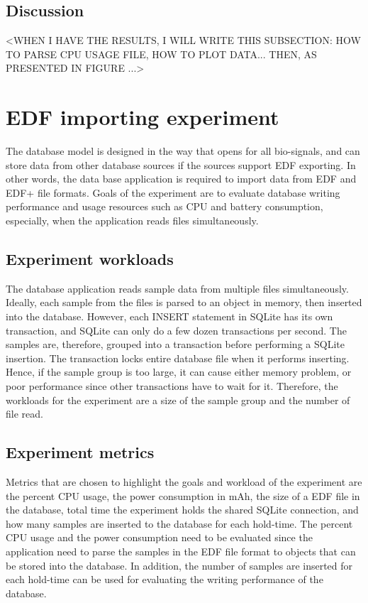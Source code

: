 \subsection{Discussion}
<WHEN I HAVE THE RESULTS, I WILL WRITE THIS SUBSECTION: HOW TO PARSE CPU USAGE FILE, HOW TO PLOT DATA... THEN, AS PRESENTED IN FIGURE ...>
\section{EDF importing experiment}
The database model is designed in the way that opens for all bio-signals, and can store data from other database sources if the sources support EDF exporting. In other words, the data base application is required to import data from EDF and EDF+ file formats. Goals of the experiment are to evaluate database writing performance and usage resources such as CPU and battery consumption, especially, when the application reads files simultaneously.
\subsection{Experiment workloads}
The database application reads sample data from multiple files simultaneously. Ideally, each sample from the files is parsed to an object in memory, then inserted into the database. However, each INSERT statement in SQLite has its own transaction, and SQLite can only do a few dozen transactions per second. The samples are, therefore, grouped into a transaction before performing a SQLite insertion. The transaction locks entire database file when it performs inserting. Hence, if the sample group is too large, it can cause either memory problem, or poor performance since other transactions have to wait for it. Therefore, the workloads for the experiment are a size of the sample group and the number of file read.
\subsection{Experiment metrics}
Metrics that are chosen to highlight the goals and workload of the experiment are the percent CPU usage, the power consumption in mAh, the size of a EDF file in the database, total time the experiment holds the shared SQLite connection, and how many samples are inserted to the database for each hold-time. The percent CPU usage and the power consumption need to be evaluated since the application need to parse the samples in the EDF file format to objects that can be stored into the database. In addition, the number of samples are inserted for each hold-time can be used for evaluating the writing performance of the database.
